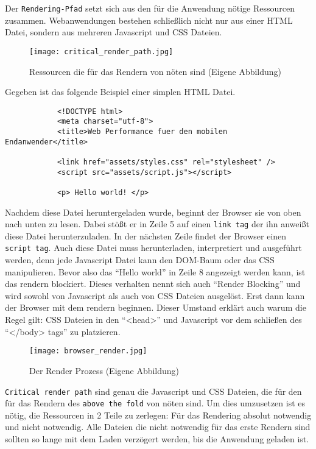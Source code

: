 		Der \texttt{Rendering-Pfad} setzt sich aus den für die Anwendung nötige Ressourcen zusammen. Webanwendungen bestehen schließlich nicht nur aus einer HTML Datei, sondern aus mehreren Javascript und CSS Dateien.

		\begin{figure}[htbp]
			\begin{center}
				\texttt{[image: critical\_render\_path.jpg]}
				\caption{Ressourcen die für das Rendern von nöten sind (Eigene Abbildung)}
				\label{fig:critical_render_path}
			\end{center}
		\end{figure}

		Gegeben ist das folgende Beispiel einer simplen HTML Datei.

		\begin{lstlisting}
			<!DOCTYPE html>
			<meta charset="utf-8">
			<title>Web Performance fuer den mobilen Endanwender</title>

			<link href="assets/styles.css" rel="stylesheet" />
			<script src="assets/script.js"></script>

			<p> Hello world! </p>

		\end{lstlisting}

		Nachdem diese Datei heruntergeladen wurde, beginnt der Browser sie von oben nach unten zu lesen. Dabei stößt er in Zeile 5 auf einen \texttt{link tag} der ihn anweißt diese Datei herunterzuladen. In der nächsten Zeile findet der Browser einen \texttt{script tag}. Auch diese Datei muss herunterladen, interpretiert und ausgeführt werden, denn jede Javascript Datei kann den DOM-Baum oder das CSS manipulieren. Bevor also das "`Hello world"' in Zeile 8 angezeigt werden kann, ist das rendern blockiert. Dieses verhalten nennt sich auch "`Render Blocking"' und wird sowohl von Javascript als auch von CSS Dateien ausgelöst.	Erst dann kann der Browser mit dem rendern beginnen. Dieser Umstand erklärt auch warum die Regel gilt: CSS Dateien in den "`<head>"' und Javascript vor dem schließen des "`</body> tags"' zu platzieren.

		\begin{figure}[htbp]
			\begin{center}
				\texttt{[image: browser\_render.jpg]}
				\caption{Der Render Prozess (Eigene Abbildung)}
				\label{fig:browser_render}
			\end{center}
		\end{figure}
	
		\texttt{Critical render path} sind genau die Javascript und CSS Dateien, die für den für das Rendern des \texttt{above the fold} von nöten sind. Um dies umzusetzen ist es nötig, die Ressourcen in 2 Teile zu zerlegen: Für das Rendering absolut notwendig und nicht notwendig. Alle Dateien die nicht notwendig für das erste Rendern sind sollten so lange mit dem Laden verzögert werden, bis die Anwendung geladen ist.





\pagebreak

